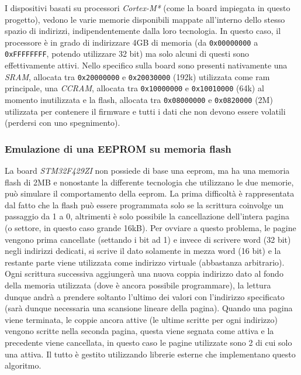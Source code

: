 I dispositivi basati su processori \textit{Cortex-M*} (come la board impiegata in questo progetto), vedono le varie memorie disponibili mappate all'interno dello stesso spazio di indirizzi, indipendentemente dalla loro tecnologia. In questo caso, il processore \`e in grado di indirizzare 4GB di memoria (da \texttt{0x00000000} a \texttt{0xFFFFFFFF}, potendo utilizzare 32 bit) ma solo alcuni di questi sono effettivamente attivi. Nello specifico sulla board sono presenti nativamente una \textit{SRAM}, allocata tra \texttt{0x20000000} e \texttt{0x20030000} (192k) utilizzata come ram principale, una \textit{CCRAM}, allocata tra \texttt{0x10000000} e \texttt{0x10010000} (64k) al momento inutilizzata e la flash, allocata tra \texttt{0x08000000} e \texttt{0x0820000} (2M) utilizzata per contenere il firmware e tutti i dati che non devono essere volatili (perdersi con uno spegnimento).

\subsubsection{Emulazione di una EEPROM su memoria flash}

La board \textit{STM32F429ZI} non possiede di base una eeprom, ma ha una memoria flash di 2MB e nonostante la differente tecnologia che utilizzano le due memorie, pu\`o simulare il comportamento della eeprom. La prima difficolt\`a \`e rappresentata dal fatto che la flash pu\`o essere programmata solo se la scrittura coinvolge un passaggio da 1 a 0, altrimenti \`e solo possibile la cancellazione dell'intera pagina (o settore, in questo caso grande 16kB). Per ovviare a questo problema, le pagine vengono prima cancellate (settando i bit ad 1) e invece di scrivere word (32 bit) negli indirizzi dedicati, si scrive il dato solamente in mezza word (16 bit) e la restante parte viene utilizzata come indirizzo virtuale (abbastanza arbitrario). Ogni scrittura successiva aggiunger\`a una nuova coppia indirizzo dato al fondo della memoria utilizzata (dove \`e ancora possibile programmare), la lettura dunque andr\`a a prendere soltanto l'ultimo dei valori con l'indirizzo specificato (sar\`a dunque necessaria una scansione lineare della pagina). Quando una pagina viene terminata, le coppie ancora attive (le ultime scritte per ogni indirizzo) vengono scritte nella seconda pagina, questa viene segnata come attiva e la precedente viene cancellata, in questo caso le pagine utilizzate sono 2 di cui solo una attiva. Il tutto \`e gestito utilizzando librerie esterne che implementano questo algoritmo.

